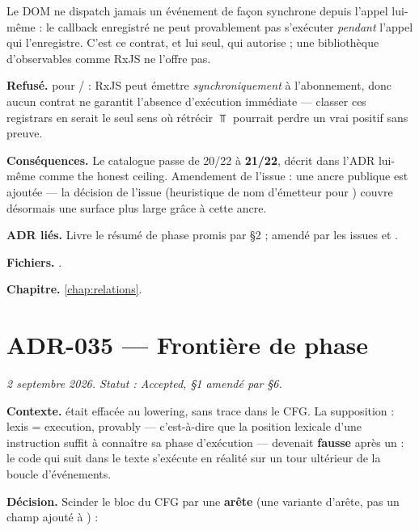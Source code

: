 \begin{react}
Le DOM ne dispatch jamais un événement de façon synchrone depuis l'appel
 lui-même : le callback enregistré ne peut provablement
pas s'exécuter \emph{pendant} l'appel qui l'enregistre. C'est ce contrat, et
lui seul, qui autorise  ; une bibliothèque d'observables
comme RxJS ne l'offre pas.
\end{react}

\textbf{Refusé.}  pour / : RxJS peut
émettre \emph{synchroniquement} à l'abonnement, donc aucun contrat ne
garantit l'absence d'exécution immédiate --- classer ces registrars en
 serait le seul sens où \og rétrécir $\Top$\fg{} pourrait perdre
un vrai positif sans preuve.

\textbf{Conséquences.} Le catalogue passe de 20/22 à \textbf{21/22}, décrit
dans l'ADR lui-même comme \og the honest ceiling\fg{}. Amendement de l'issue
 : une ancre publique  est ajoutée --- la
décision  de l'issue  (heuristique de nom
d'émetteur pour ) couvre désormais une surface plus
large grâce à cette ancre.

\textbf{ADR liés.} Livre le résumé de phase promis par  §2 ; amendé
par les issues  et .

\textbf{Fichiers.} .

\textbf{Chapitre.} \cref{chap:relations}.

\section{ADR-035 --- Frontière de phase }
\label{adr:35}
\noindent\textit{2 septembre 2026. Statut : Accepted, §1 amendé par  §6.}

\textbf{Contexte.}  était effacée au lowering, sans
trace dans le CFG. La supposition \og {} : lexis = execution,
provably\fg{} --- c'est-à-dire que la position lexicale d'une instruction
suffit à connaître sa phase d'exécution --- devenait \textbf{fausse} après un
 : le code qui suit dans le texte s'exécute en réalité sur un tour
ultérieur de la boucle d'événements.

\textbf{Décision.} Scinder le bloc du CFG par une \textbf{arête}
 (une variante d'arête, pas un champ ajouté à
) :

